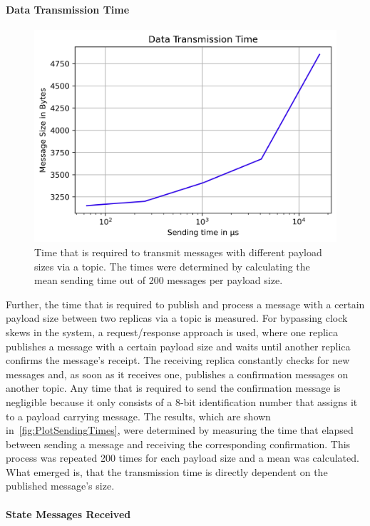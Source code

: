 \paragraph{Data Transmission Time}
\begin{figure}[!htb]
	\centering
	\includegraphics[width=0.75\linewidth]{images/plots/sendingTimes}
	\caption{Time that is required to transmit messages with different payload sizes via a  topic. The times were determined by calculating the mean sending time out of 200 messages per payload size.}
	\label{fig:PlotSendingTimes}
\end{figure}


Further, the time that is required to publish and process a message with a certain payload size between two replicas via a  topic is measured.
For bypassing clock skews in the system, a request/response approach is used, where one replica publishes a message with a certain payload size and waits until another replica confirms the message's receipt.
The receiving replica constantly checks for new messages and, as soon as it receives one, publishes a confirmation messages on another topic.
Any time that is required to send the confirmation message is negligible because it only consists of a 8-bit identification number that assigns it to a payload carrying message.
The results, which are shown in~\autoref{fig:PlotSendingTimes}, were determined by measuring the time that elapsed between sending a message and receiving the corresponding confirmation.
This process was repeated 200 times for each payload size and a mean was calculated.
What emerged is, that the transmission time is directly dependent on the published message's size.



\paragraph{State Messages Received}

